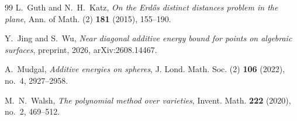 \documentclass[11pt]{amsart}
\numberwithin{equation}{section}
\theoremstyle{definition}
\theoremstyle{remark}
\newcommand{\1}{\mathbf 1}
\begin{document}
\begin{thebibliography}{99}
L.~Guth and N.~H.~Katz,
\emph{On the Erd\H{o}s distinct distances problem in the plane},
Ann. of Math. (2) \textbf{181} (2015), 155--190.

Y.~Jing and S.~Wu,
\emph{Near diagonal additive energy bound for points on algebraic surfaces},
preprint, 2026, arXiv:2608.14467.

A.~Mudgal,
\emph{Additive energies on spheres},
J. Lond. Math. Soc. (2) \textbf{106} (2022), no.~4, 2927--2958.

M.~N.~Walsh,
\emph{The polynomial method over varieties},
Invent. Math. \textbf{222} (2020), no.~2, 469--512.

\end{thebibliography}
\enlargethispage{4\baselineskip}
\end{document}
